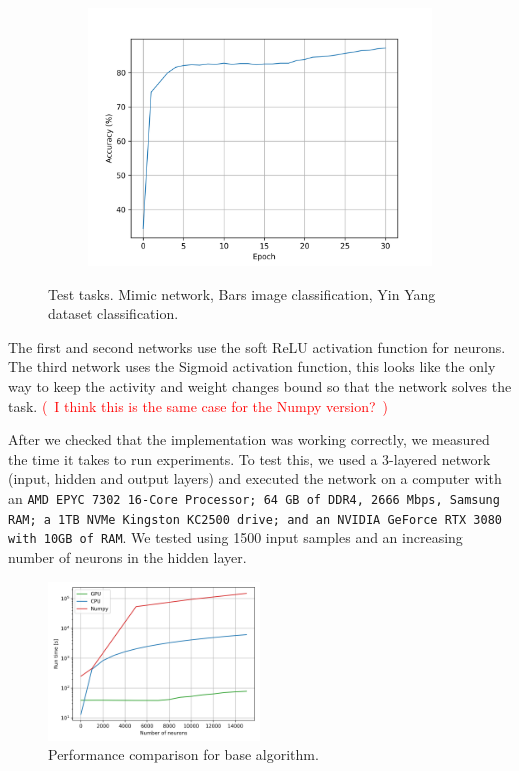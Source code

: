 \documentclass{article}
\newcommand\note[1]{\textcolor{red}{(~#1~)}}
\begin{document}
\begin{figure}[hbt]
\begin{subfigure}[b]{0.33\textwidth}
        \centering 
        \includegraphics[width=\textwidth]{std_yinyang_accuracy.png}
        \caption{}
        \label{fig:std-yinyang-validation}
    \end{subfigure}
    \caption{Test tasks. Mimic network, Bars image classification, Yin Yang dataset classification.}
    \label{fig:std-test-tasks}
\end{figure}

The first and second networks use the soft ReLU activation function for neurons.
The third network uses the Sigmoid activation function, this looks like the only way to keep the activity and weight changes bound so that the network solves the task. 
\note{I think this is the same case for the Numpy version?}



After we checked that the implementation was working correctly, we measured the time it takes to run experiments. 
To test this, we used a 3-layered network (input, hidden and output layers) and executed the network on a computer with an 
\texttt{AMD EPYC 7302 16-Core Processor; 64 GB of DDR4, 2666 Mbps, Samsung RAM; a 1TB NVMe Kingston KC2500 drive; and an NVIDIA GeForce RTX 3080 with 10GB of RAM}. 
We tested using 1500 input samples and an increasing number of neurons in the hidden layer.

\begin{figure}[h]
    \centering
    \includegraphics[width=0.5\textwidth]{perf_Numpy_comparison_with_1500_inputs.png}
    \caption{Performance comparison for base algorithm.}
    \label{fig:perf-comparison-basic}
\end{figure}
\end{document}
